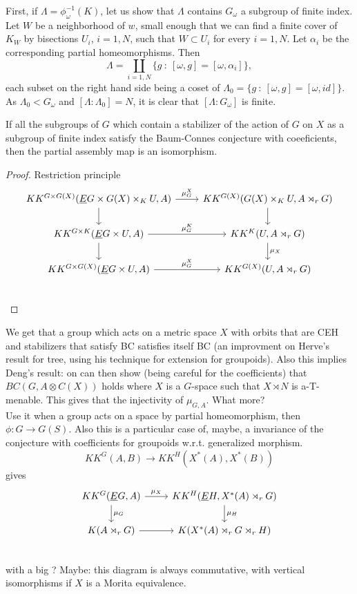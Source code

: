 First, if $\Lambda= \phi^{-1}_\omega(K)$, let us show that $\Lambda$ contains $G_\omega$ a subgroup of finite index. Let $W$ be a neighborhood of $w$, small enough that we can find a  finite cover of $K_W$ by bisections $U_i$, $i=1,N$, such that $W\subset U_i$ for every $i=1,N$. Let $\alpha_i $ be the corresponding partial homeomorphisms. Then 
\[\Lambda = \coprod_{i=1,N} \{g \ : \ [\omega , g ] = [\omega, \alpha_i]\},\]
each subset on the right hand side being a coset of $\Lambda_0 = \{g \ : \ [\omega , g ] = [\omega, id] \}$. As $\Lambda_0< G_\omega$ and $[\Lambda : \Lambda_0] =N$, it is clear that $[\Lambda : G_\omega]$ is finite.  

\begin{prop}
If all the subgroups of $G$ which contain a stabilizer of the action of $G$ on $X$ as a subgroup of finite index satisfy the Baum-Connes conjecture with coeeficients, then the partial assembly map is an isomorphism.
\end{prop} 

\begin{proof} Restriction principle
\[\begin{tikzcd}
KK^{G\times G(X)}(\underline E G\times G(X)\times_{K}U , A ) \arrow{d}{}\arrow{r}{\mu_G^X } 
		& KK^{G(X)}(G(X)\times_{K}U , A\rtimes_r G ) 	\arrow{d}{}\\
KK^{G\times K}(\underline E G\times U , A ) \arrow{d}{}\arrow{r}{\mu_G^K } 
		& KK^{K}(U , A\rtimes_r G ) 	\arrow{d}{\mu_X}\\
KK^{G\times G(X)}(\underline E G \times U , A )\arrow{r}{\mu_G^X } 
		& KK^{G(X)}(U , A\rtimes_r G ) \\
		\end{tikzcd}\]
\end{proof}

We get that a group which acts on a metric space $X$ with orbits that are CEH and stabilizers that satisfy BC satisfies itself BC (an improvment on Herve's result for tree, using his technique for extension for groupoids). Also this implies Deng's result: on can then show (being careful for the coefficients) that $BC(G, A \otimes C(X))$ holds where $X$ is a $G$-space such that $X\rtimes N$ is a-T-menable. This gives that the injectivity of $\mu_{G,A}$. What more?\\

Use it when a group acts on a space by partial homeomorphism, then $\phi: G \rightarrow G(S)$. Also this is a particular case of, maybe, a invariance of the conjecture with coefficients for groupoids w.r.t. generalized morphism.
\[KK^G(A,B) \rightarrow KK^H(X^*(A), X^*(B))\]
gives
\[\begin{tikzcd}
KK^{G}(\underline E G, A ) \arrow{d}{\mu_{G}}\arrow{r}{\mu_X} 
		& KK^{H}(\underline E H, X^*(A)\rtimes_r G ) 	\arrow{d}{\mu_H}\\
	K(A\rtimes_r G) \arrow{r}	& K(X^*(A)\rtimes_r G \rtimes_r H) \\ 
\end{tikzcd}\]
with a big ? Maybe: this diagram is always commutative, with vertical isomorphisms if $X$ is a Morita equivalence.\\

